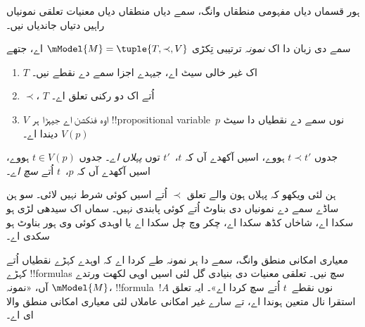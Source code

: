 \documentclass[../../../include/open-logic-section]{subfiles}
\begin{document}
ہور قسماں دیاں مفہومی منطقاں وانگ، سمے دیاں منطقاں دیاں معنیات تعلقی نمونیاں راہیں دتیاں جاندیاں نیں۔

\begin{defn}
  سمے دی زبان دا اک \emph{نمونہ} ترتیبی تِکڑی
  $\mModel{M} = \tuple{T, \prec, V}$ اے، جتھے
  \begin{enumerate}
  \item $T$ اک غیر خالی سیٹ اے، جیہدے اجزا سمے دے نقطے نیں۔
  \item $\prec$، $T$ اُتے اک دو رکنی تعلق اے۔
  \item $V$ اوہ فنکشن اے جیہڑا ہر !!{propositional
    variable}~$p$ نوں سمے دے نقطیاں دا سیٹ $V(p)$ دیندا اے۔
  \end{enumerate}
  جدوں $t \prec t'$ ہووے، اسیں آکھدے آں کہ $t$،~$t'$ توں
  \emph{پہلاں اے}۔
  جدوں $t \in V(p)$ ہووے، اسیں آکھدے آں کہ $p$،~$t$ اُتے \emph{سچ اے}۔
\end{defn}

ہن لئی ویکھو کہ پہلاں ہون والے تعلق $\prec$ اُتے اسیں کوئی شرط
نہیں لائی۔ سو ہن ساڈے سمے دے نمونیاں دی بناوٹ اُتے کوئی پابندی نہیں۔
سماں اک سیدھی لڑی ہو سکدا اے، شاخاں کڈھ سکدا اے، چکر وچ چل سکدا اے
یا اوہدی کوئی وی ہور بناوٹ ہو سکدی اے۔

معیاری امکانی منطق وانگ، سمے دا ہر نمونہ طے کردا اے کہ اوہدے کہڑے
نقطیاں اُتے کہڑے !!{formula}s سچ نیں۔ تعلقی معنیات دی بنیادی گل لئی
اسیں اوہی لکھت ورتدے آں، «نمونہ $\mModel{M}$، !!{formula}~$!A$
نوں نقطے~$t$ اُتے سچ کردا اے»۔ ایہ تعلق استقرا نال متعین ہوندا اے،
تے سارے غیر امکانی عاملاں لئی معیاری امکانی منطق والا ای اے۔
\end{document}
